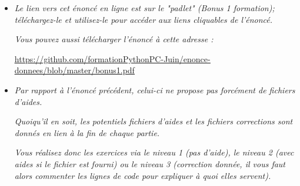 \documentclass[11pt]{article}
\begin{document}
\begin{itemize}

\item \textit{Le lien vers cet énoncé en ligne est sur le "padlet" (Bonus 1 formation); téléchargez-le et utilisez-le pour accéder aux liens cliquables de l'énoncé.}


\medskip

\textit{Vous pouvez aussi télécharger l'énoncé à cette adresse : }


\begin{center}
\underline{\url{https://github.com/formationPythonPC-Juin/enonce-donnees/blob/master/bonus1.pdf}                                                                                               }
\end{center}







\bigskip










\item \textit{Par rapport à l'énoncé précédent, celui-ci ne propose pas forcément  de fichiers d'aides.}

\medskip

\textit{Quoiqu'il en soit, les potentiels fichiers d'aides et les fichiers corrections sont donnés en lien à la fin de chaque partie.}

\medskip
\textit{Vous réalisez donc les exercices via le niveau 1 (pas d'aide), le niveau 2 (avec aides si le fichier est fourni) ou le niveau 3 (correction donnée, il vous faut alors commenter les lignes de code pour expliquer à quoi elles servent).} 








\bigskip














\end{itemize}
\end{document}
